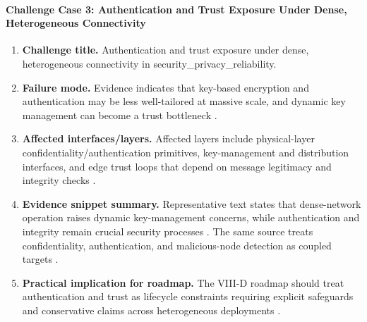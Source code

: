 \documentclass[lettersize,journal]{IEEEtran}
\begin{document}
\paragraph{Challenge Case 3: Authentication and Trust Exposure Under Dense, Heterogeneous Connectivity}
\begin{enumerate}
    \item \textbf{Challenge title.} Authentication and trust exposure under dense, heterogeneous connectivity in security\_privacy\_reliability.
    \item \textbf{Failure mode.} Evidence indicates that key-based encryption and authentication may be less well-tailored at massive scale, and dynamic key management can become a trust bottleneck \cite{O_ISAC_156}.
    \item \textbf{Affected interfaces/layers.} Affected layers include physical-layer confidentiality/authentication primitives, key-management and distribution interfaces, and edge trust loops that depend on message legitimacy and integrity checks \cite{O_ISAC_156}.
    \item \textbf{Evidence snippet summary.} Representative text states that dense-network operation raises dynamic key-management concerns, while authentication and integrity remain crucial security processes \cite{O_ISAC_156}. The same source treats confidentiality, authentication, and malicious-node detection as coupled targets \cite{O_ISAC_156}.
    \item \textbf{Practical implication for roadmap.} The VIII-D roadmap should treat authentication and trust as lifecycle constraints requiring explicit safeguards and conservative claims across heterogeneous deployments \cite{O_ISAC_156}.
\end{enumerate}
\end{document}
